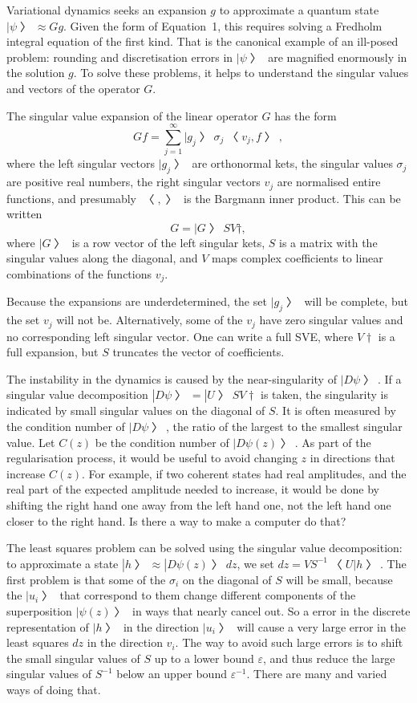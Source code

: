 
Variational dynamics seeks an expansion $g$ to approximate a quantum state $|ψ〉≈Gg$.  Given the form of Equation~1, this requires solving a Fredholm integral equation of the first kind.  That is the canonical example of an ill-posed problem: rounding and discretisation errors in $|ψ〉$ are magnified enormously in the solution $g$.  To solve these problems, it helps to understand the singular values and vectors of the operator $G$.

The singular value expansion of the linear operator $G$ has the form
$$Gf = ∑_{j=1}^∞ |g_j〉σ_j〈v_j,f〉,$$
where the left singular vectors $|g_j〉$ are orthonormal kets, the singular values $σ_j$ are positive real numbers, the right singular vectors $v_j$ are normalised entire functions, and presumably $〈,〉$ is the Bargmann inner product.  This can be written
$$G = |G〉SV†,$$
where $|G〉$ is a row vector of the left singular kets, $S$ is a matrix with the singular values along the diagonal, and $V$ maps complex coefficients to linear combinations of the functions $v_j$.

Because the expansions are underdetermined, the set $|g_j〉$ will be complete, but the set $v_j$ will not be.  Alternatively, some of the $v_j$ have zero singular values and no corresponding left singular vector.  One can write a full SVE, where $V†$ is a full expansion, but $S$ truncates the vector of coefficients.

The instability in the dynamics is caused by the near-singularity of $|Dψ〉$.  If a singular value decomposition $|Dψ〉=|U〉SV†$ is taken, the singularity is indicated by small singular values on the diagonal of $S$.  It is often measured by the condition number of $|Dψ〉$, the ratio of the largest to the smallest singular value.  Let $C(z)$ be the condition number of $|Dψ(z)〉$.  As part of the regularisation process, it would be useful to avoid changing $z$ in directions that increase $C(z)$.  For example, if two coherent states had real amplitudes, and the real part of the expected amplitude needed to increase, it would be done by shifting the right hand one away from the left hand one, not the left hand one closer to the right hand.  Is there a way to make a computer do that?

The least squares problem can be solved using the singular value decomposition: to approximate a state $|h〉≈|Dψ(z)〉dz$, we set $dz=VS^{-1}〈U|h〉$.  The first problem is that some of the $σ_i$ on the diagonal of $S$ will be small, because the $|u_i〉$ that correspond to them change different components of the superposition $|ψ(z)〉$ in ways that nearly cancel out.  So a error in the discrete representation of $|h〉$ in the direction $|u_i〉$ will cause a very large error in the least squares $dz$ in the direction $v_i$.   The way to avoid such large errors is to shift the small singular values of $S$ up to a lower bound $ε$, and thus reduce the large singular values of $S^{-1}$ below an upper bound $ε^{-1}$.  There are many and varied ways of doing that. 

